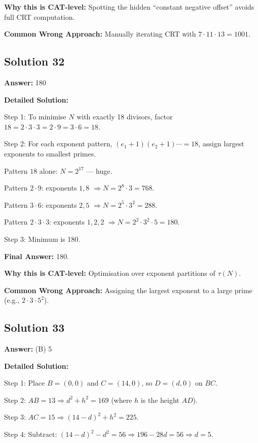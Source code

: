 \documentclass[11pt]{article}
\begin{document}
\textbf{Why this is CAT-level:} Spotting the hidden ``constant negative offset'' avoids full CRT computation.

\textbf{Common Wrong Approach:} Manually iterating CRT with $7 \cdot 11 \cdot 13 = 1001$.

\subsection*{Solution 32}
\textbf{Answer:} 180

\textbf{Detailed Solution:}

Step 1: To minimise $N$ with exactly 18 divisors, factor $18 = 2 \cdot 3 \cdot 3 = 2 \cdot 9 = 3 \cdot 6 = 18$.

Step 2: For each exponent pattern, $(e_1 + 1)(e_2 + 1) \cdots = 18$, assign largest exponents to smallest primes.

Pattern $18$ alone: $N = 2^{17}$ — huge.

Pattern $2 \cdot 9$: exponents $1, 8$ $\Rightarrow N = 2^8 \cdot 3 = 768$.

Pattern $3 \cdot 6$: exponents $2, 5$ $\Rightarrow N = 2^5 \cdot 3^2 = 288$.

Pattern $2 \cdot 3 \cdot 3$: exponents $1, 2, 2$ $\Rightarrow N = 2^2 \cdot 3^2 \cdot 5 = 180$.

Step 3: Minimum is 180.

\textbf{Final Answer:} 180.

\textbf{Why this is CAT-level:} Optimisation over exponent partitions of $\tau(N)$.

\textbf{Common Wrong Approach:} Assigning the largest exponent to a large prime (e.g., $2 \cdot 3 \cdot 5^2$).

\subsection*{Solution 33}
\textbf{Answer:} (B) 5

\textbf{Detailed Solution:}

Step 1: Place $B = (0, 0)$ and $C = (14, 0)$, so $D = (d, 0)$ on $BC$.

Step 2: $AB = 13 \Rightarrow d^2 + h^2 = 169$ (where $h$ is the height $AD$).

Step 3: $AC = 15 \Rightarrow (14 - d)^2 + h^2 = 225$.

Step 4: Subtract: $(14 - d)^2 - d^2 = 56 \Rightarrow 196 - 28 d = 56 \Rightarrow d = 5$.
\end{document}
